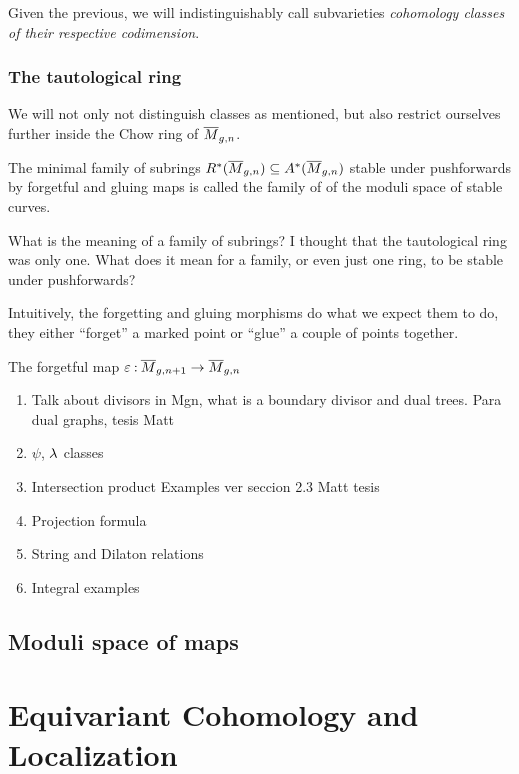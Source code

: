 \documentclass[12pt]{memoir}
\begin{document}
Given the previous, we will indistinguishably call subvarieties \emph{cohomology classes of their respective codimension}.

\subsection{The tautological ring}

We will not only not distinguish classes as mentioned, but also restrict ourselves further inside the Chow ring of $\overline M_{g,n}$. 

\begin{Def}
The minimal family of subrings $R^\ast(\overline M_{g,n})\subseteq A^\ast(\overline M_{g,n})$ stable under pushforwards by forgetful and gluing maps is called the family of  of the moduli space of stable curves.
\end{Def}

\begin{Qn}
What is the meaning of a family of subrings? I thought that the tautological ring was only one. What does it mean for a family, or even just one ring, to be stable under pushforwards?
\end{Qn}

Intuitively, the forgetting and gluing morphisms do what we expect them to do, they either ``forget'' a marked point or ``glue'' a couple of points together.  

\begin{Def}
    The forgetful map $\varepsilon\mathbin{:}\overline M_{g,n+1}\to\overline M_{g,n}$
\end{Def}
\begin{enumerate}
    \item Talk about divisors in Mgn, what is a boundary divisor and dual trees. Para dual graphs, tesis Matt
    \item $\psi$, $\lambda$ classes
    \item Intersection product Examples ver seccion 2.3 Matt tesis
    \item Projection formula
    \item String and Dilaton relations
    \item Integral examples
\end{enumerate}

\section{Moduli space of maps}

\chapter{Equivariant Cohomology and Localization}
\end{document}
